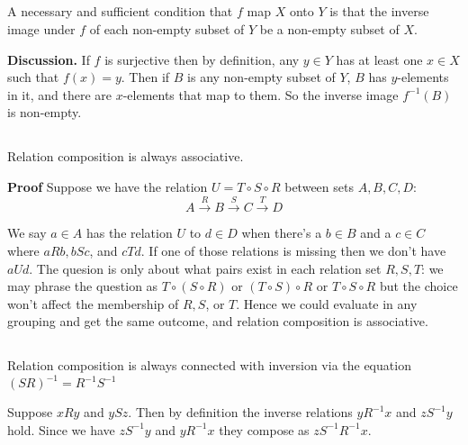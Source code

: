 \documentclass{article}
\begin{document}
\begin{enumerate}[i]
\subsection{} A necessary and sufficient condition that $f$ map $X$ onto $Y$ is that the inverse image under $f$ of each non-empty subset of $Y$ be a non-empty subset of $X$.

\textbf{Discussion.} If $f$ is surjective then by definition, any $y \in Y$ has at least one $x \in X$ such that $f(x) = y$. Then if $B$ is any non-empty subset of $Y$, $B$ has $y$-elements in it, and there are $x$-elements that map to them. So the inverse image $f^{-1}(B)$ is non-empty.

\subsection{} Relation composition is always associative. 

\textbf{Proof} Suppose we have the relation $U = T \circ S \circ R$ between sets $A, B, C, D$:
$$A \stackrel{R}{\longrightarrow} B \stackrel{S}{\longrightarrow} C \stackrel{T}{\longrightarrow}D$$

We say $a \in A$ has the relation $U$ to $d \in D$ when there's a $b \in B$ and a $c \in C$ where $aRb, bSc$, and $cTd$. If one of those relations is missing then we don't have $aUd$. The quesion is only about what pairs exist in each relation set $R, S, T$: we may phrase the question as $T \circ (S \circ R)$ or $(T \circ S) \circ R$ or $T \circ S \circ R$ but the choice won't affect the membership of $R, S$, or $T$. Hence we could evaluate in any grouping and get the same outcome, and relation composition is associative.

\subsection{} Relation composition is always connected with inversion via the equation $(SR)^{-1} = R^{-1}S^{-1}$

Suppose $xRy$ and $ySz$. Then by definition the inverse relations $yR^{-1}x$ and $zS^{-1}y$ hold. Since we have $zS^{-1}y$ and $yR^{-1}x$ they compose as $z S^{-1}R^{-1} x$. 
\end{enumerate}
\end{document}
